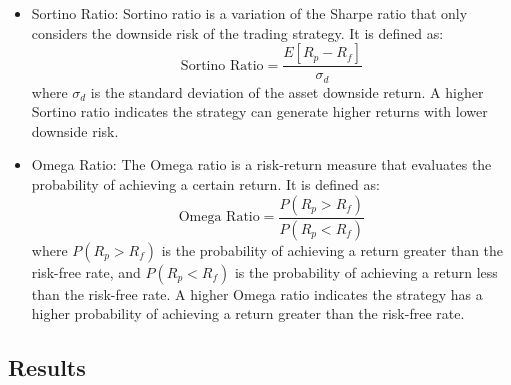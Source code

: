 \documentclass[conference]{IEEEtran}
\begin{document}
\begin{itemize}
  \item Sortino Ratio: Sortino ratio is a variation of the Sharpe ratio that only considers the downside risk of the trading strategy. It is defined as:
    \begin{equation}
      \text{Sortino Ratio} = \frac{E[R_p - R_f]}{\sigma_d}
    \end{equation}
    where $\sigma_d$ is the standard deviation of the asset downside return. A higher Sortino ratio indicates the strategy can generate higher returns with lower downside risk.
  \item Omega Ratio: The Omega ratio is a risk-return measure that evaluates the probability of achieving a certain return. It is defined as:
    \begin{equation}
      \text{Omega Ratio} = \frac{P(R_p > R_f)}{P(R_p < R_f)}
    \end{equation}
    where $P(R_p > R_f)$ is the probability of achieving a return greater than the risk-free rate, and $P(R_p < R_f)$ is the probability of achieving a return less than the risk-free rate. A higher Omega ratio indicates the strategy has a higher probability of achieving a return greater than the risk-free rate.
\end{itemize}

\subsection{Results}

\end{document}
